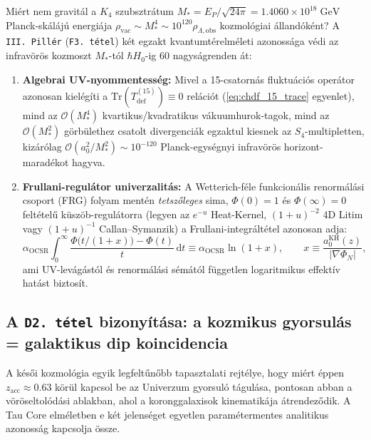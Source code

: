 \documentclass[11pt,a4paper]{article}
\theoremstyle{remark}
\begin{document}
Mi\'ert nem gravit\'al a $K_4$ szubsztr\'atum $M_* = E_P/\sqrt{24\pi} = 1.4060 \times 10^{18}\;\mathrm{GeV}$ Planck-sk\'al\'aj\'u energi\'aja $\rho_{\mathrm{vac}} \sim M_*^4 \sim 10^{120}\rho_{\Lambda,\mathrm{obs}}$ kozmol\'ogiai \'alland\'ok\'ent? A \texttt{III.\ Pill\'er} (\texttt{F3.\ t\'etel}) \cite{JolcsakTauFoundationSeries2026} k\'et egzakt kvantumt\'erelm\'eleti azonoss\'aga v\'edi az infrav\"or\"os kozmoszt $M_*$-t\'ol $\hbar H_0$-ig 60 nagys\'agrenden \'at:
\begin{enumerate}
  \item \textbf{Algebrai UV-nyommentess\'eg:} Mivel a 15-csatorn\'as fluktu\'aci\'os oper\'ator azonosan kiel\'eg\'iti a $\mathrm{Tr}(T_{\mathrm{def}}^{(15)}) \equiv 0$ rel\'aci\'ot (\eqref{eq:chdf_15_trace} egyenlet), mind az $\mathcal{O}(M_*^4)$ kvartikus/kvadratikus v\'akuumhurok-tagok, mind az $\mathcal{O}(M_*^2)$ g\"orb\"ulethez csatolt divergenci\'ak egzaktul kiesnek az $S_4$-multipletten, kiz\'ar\'olag $\mathcal{O}(a_0^2 / M_*^2) \sim 10^{-120}$ Planck-egys\'egnyi infrav\"or\"os horizont-marad\'ekot hagyva.
  \item \textbf{Frullani-regul\'ator univerzalit\'as:} A Wetterich-f\'ele funkcion\'alis renorm\'al\'asi csoport (FRG) folyam ment\'en \emph{tetsz\H{o}leges} sima, $\Phi(0) = 1$ \'es $\Phi(\infty) = 0$ felt\'etel\H{u} k\"usz\"ob-regul\'atorra (legyen az $e^{-u}$ Heat-Kernel, $(1+u)^{-2}$ 4D Litim vagy $(1+u)^{-1}$ Callan--Symanzik) a Frullani-integr\'alt\'etel azonosan adja:
  \begin{equation}
    \alpha_{\mathrm{OCSR}}\int_0^\infty \frac{\Phi\!\bigl(t/(1+x)\bigr) - \Phi(t)}{t}\,\mathrm{d}t \equiv \alpha_{\mathrm{OCSR}}\ln(1 + x), \qquad x \equiv \frac{a_0^{\mathrm{KH}}(z)}{|\nabla\Phi_N|},
    \label{eq:frullani_rg}
  \end{equation}
  ami UV-lev\'ag\'ast\'ol \'es renorm\'al\'asi s\'em\'at\'ol f\"uggetlen logaritmikus effekt\'iv hat\'ast biztos\'it.
\end{enumerate}

\subsection{A \texttt{D2.\ t\'etel} bizony\'it\'asa: a kozmikus gyorsul\'as = galaktikus dip koincidencia}

A k\'es\H{o}i kozmol\'ogia egyik legfelt\H{u}n\H{o}bb tapasztalati rejt\'elye, hogy mi\'ert \'eppen $z_{\mathrm{acc}} \approx 0.63$ k\"or\"ul kapcsol be az Univerzum gyorsul\'o t\'agul\'asa, pontosan abban a v\"or\"oseltol\'od\'asi ablakban, ahol a koronggalaxisok kinematik\'aja \'atrendez\H{o}dik. A Tau Core elm\'eletben e k\'et jelens\'eget egyetlen param\'etermentes analitikus azonoss\'ag kapcsolja \"ossze.
\end{document}

